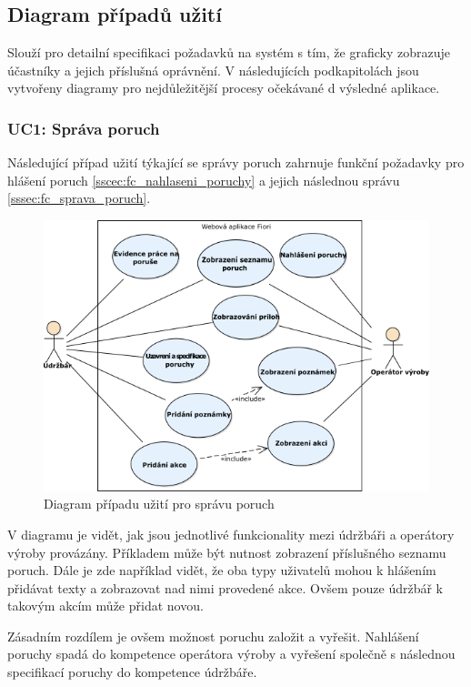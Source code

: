 \documentclass[thesis=M,czech]{FITthesis}[2012/06/26]
\begin{document}
\subsection{Diagram případů užití}
Slouží pro detailní specifikaci požadavků na systém s tím, že graficky zobrazuje účastníky a jejich příslušná oprávnění. V následujících podkapitolách jsou vytvořeny diagramy pro nejdůležitější procesy očekávané d výsledné aplikace.
\label{ssec:diagram_pripadu_uziti}
\subsubsection{UC1: Správa poruch}
\label{sssec:uc_sprava_poruch}
Následující případ užití týkající se správy poruch zahrnuje funkční požadavky pro hlášení poruch \ref{sscec:fc_nahlaseni_poruchy} a jejich následnou správu \ref{sssec:fc_sprava_poruch}.
\begin{figure}[H]
	\centering
	\includegraphics[width=1\textwidth]{images/ea_sprava_poruch}
	\caption{Diagram případu užití pro správu poruch}
	\label{img:uc_poruchy}
\end{figure}
V diagramu je vidět, jak jsou jednotlivé funkcionality mezi údržbáři a operátory výroby provázány. Příkladem může být nutnost zobrazení příslušného seznamu poruch. Dále je zde například vidět, že oba typy uživatelů mohou k hlášením přidávat texty a zobrazovat nad nimi provedené akce. Ovšem pouze údržbář k takovým akcím může přidat novou.

Zásadním rozdílem je ovšem možnost poruchu založit a vyřešit. Nahlášení poruchy spadá do kompetence operátora výroby a vyřešení společně s následnou specifikací poruchy do kompetence údržbáře.
\end{document}
